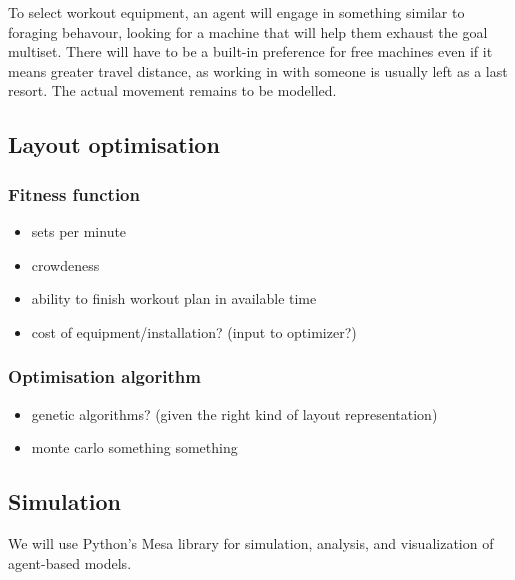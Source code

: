 \documentclass[9pt]{pnas-new}
\begin{document}
To select workout equipment, an agent will engage in something similar to foraging behavour, looking for a machine that will help them exhaust the goal multiset. There will have to be a built-in preference for free machines even if it means greater travel distance, as working in with someone is usually left as a last resort. The actual movement remains to be modelled.


\subsection*{Layout optimisation}

\subsubsection*{Fitness function} %

\begin{itemize}
	\item sets per minute
	\item crowdeness
	\item ability to finish workout plan in available time
	\item cost of equipment/installation? (input to optimizer?)
\end{itemize}

\subsubsection*{Optimisation algorithm}
\begin{itemize}
	\item genetic algorithms? (given the right kind of layout representation)
	\item monte carlo something something
\end{itemize}


\subsection*{Simulation}

We will use Python's Mesa library for simulation, analysis, and visualization of agent-based models.
\end{document}
